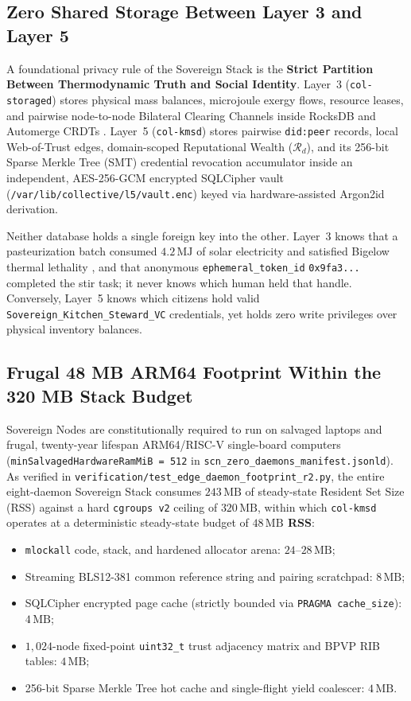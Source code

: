 \subsection{Zero Shared Storage Between Layer 3 and Layer 5}

A foundational privacy rule of the Sovereign Stack is the \textbf{Strict Partition Between
Thermodynamic Truth and Social Identity}. Layer~3 (\texttt{col-storaged}) stores physical mass
balances, microjoule exergy flows, resource leases, and pairwise node-to-node Bilateral Clearing
Channels inside RocksDB and Automerge CRDTs \parencite{shapiro2011crdt}. Layer~5
(\texttt{col-kmsd}) stores pairwise \texttt{did:peer} records, local Web-of-Trust edges,
domain-scoped Reputational Wealth ($\mathcal{R}_d$), and its 256-bit Sparse Merkle Tree (SMT)
credential revocation accumulator inside an independent, AES-256-GCM encrypted SQLCipher vault
(\texttt{/var/lib/collective/l5/vault.enc}) keyed via hardware-assisted Argon2id derivation.

Neither database holds a single foreign key into the other. Layer~3 knows that a pasteurization
batch consumed $4.2\,\mathrm{MJ}$ of solar electricity and satisfied Bigelow thermal lethality
\parencite{bigelow1921thermal}, and that anonymous \texttt{ephemeral\_token\_id}
\texttt{0x9fa3...} completed the stir task; it never knows which human held that handle.
Conversely, Layer~5 knows which citizens hold valid \texttt{Sovereign\_Kitchen\_Steward\_VC}
credentials, yet holds zero write privileges over physical inventory balances.

\subsection{Frugal 48 MB ARM64 Footprint Within the 320 MB Stack Budget}

Sovereign Nodes are constitutionally required to run on salvaged laptops and frugal, twenty-year
lifespan ARM64/RISC-V single-board computers (\texttt{minSalvagedHardwareRamMiB = 512} in
\texttt{scn\_zero\_daemons\_manifest.jsonld}). As verified in
\texttt{verification/test\_edge\_daemon\_footprint\_r2.py}, the entire eight-daemon Sovereign
Stack consumes $243\,\mathrm{MB}$ of steady-state Resident Set Size (RSS) against a hard
\texttt{cgroups v2} ceiling of $320\,\mathrm{MB}$, within which \texttt{col-kmsd} operates at a
deterministic steady-state budget of \textbf{$48\,\mathrm{MB}$ RSS}:
\begin{itemize}
\item \texttt{mlockall} code, stack, and hardened allocator arena: $24\text{--}28\,\mathrm{MB}$;
\item Streaming BLS12-381 common reference string and pairing scratchpad: $8\,\mathrm{MB}$;
\item SQLCipher encrypted page cache (strictly bounded via \texttt{PRAGMA cache\_size}): $4\,\mathrm{MB}$;
\item $1{,}024$-node fixed-point \texttt{uint32\_t} trust adjacency matrix and BPVP RIB tables: $4\,\mathrm{MB}$;
\item 256-bit Sparse Merkle Tree hot cache and single-flight yield coalescer: $4\,\mathrm{MB}$.
\end{itemize}

